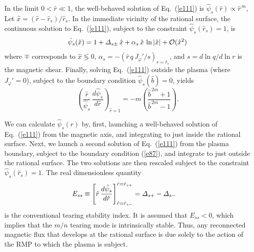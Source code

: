 \documentclass[12pt,prb,aps]{revtex4-1}
\begin{document}
In the limit $0<\hat{r}\ll 1$, the well-behaved solution of Eq.~(\ref{e111}) is 
$\hat{\psi}_s(\hat{r})\propto \hat{r}^{\,m}$,
Let $\hat{x} = (\hat{r}-\hat{r}_s)/\hat{r}_s$. 
In the immediate vicinity of the rational surface, the continuous solution to Eq.~(\ref{e111}), subject to the constraint 
$\hat{\psi}_s(\hat{r}_s)=1$, is 
\begin{equation}\label{e18}
\hat{\psi}_s(\hat{x}) = 1+{\mit\Delta}_{s\pm}\,\hat{x} +\alpha_s\,\hat{x}\,\ln|\hat{x}| + {\cal O}(\hat{x}^2)
\end{equation}
where $\mp$ corresponds to $\hat{x}\lessgtr 0$, $\alpha_s = -\left(\hat{r}\,q\,J_\varphi'/s\right)_{\hat{r}=\hat{r}_s}$, 
and $s=d\ln q/d\ln r$ is the magnetic shear. 
Finally, solving Eq.~(\ref{e111}) outside the plasma (where $J_\varphi'=0$), subject to the boundary condition $\hat{\psi}_s(\hat{b})=0$, yields 
\begin{equation}\label{e87}
\left(\frac{\hat{r}}{\hat{\psi}_s}\,\frac{d\hat{\psi}_s}{d\hat{r}}\right)_{\hat{r}=1} = -m\left(\frac{\hat{b}^{\,2m}+1}{\hat{b}^{\,2m}-1}\right).
\end{equation}

We can calculate $\hat{\psi}_s(\hat{r})$ by, first, launching a well-behaved solution of Eq.~(\ref{e111}) from the magnetic
axis, and integrating to just inside the rational surface.
Next, we launch a second solution of  Eq.~(\ref{e111}) from  the plasma boundary, subject to the boundary condition (\ref{e87}),   and integrate to just outside the rational surface. The two solutions are then rescaled subject to the
constraint $\hat{\psi}_s(\hat{r}_s)=1$. The real dimensionless quantity
\begin{align}\label{e88}
E_{ss} &\equiv \left[\hat{r}\,\frac{d\hat{\psi}_s}{d\hat{r}}\right]^{\hat{r}=\hat{r}_{s+}}_{\hat{r}=\hat{r}_{s-}} ={\mit\Delta}_{s+} -{\mit\Delta}_{s-}
\end{align}
is the  conventional tearing stability index.\cite{fkr,spk,ric3} It is assumed that $E_{ss}<0$, which implies that the $m/n$ tearing mode is intrinsically stable. Thus, any reconnected magnetic flux that develops at the rational surface is
due solely to the action of the RMP to which the plasma is subject.
\end{document}
